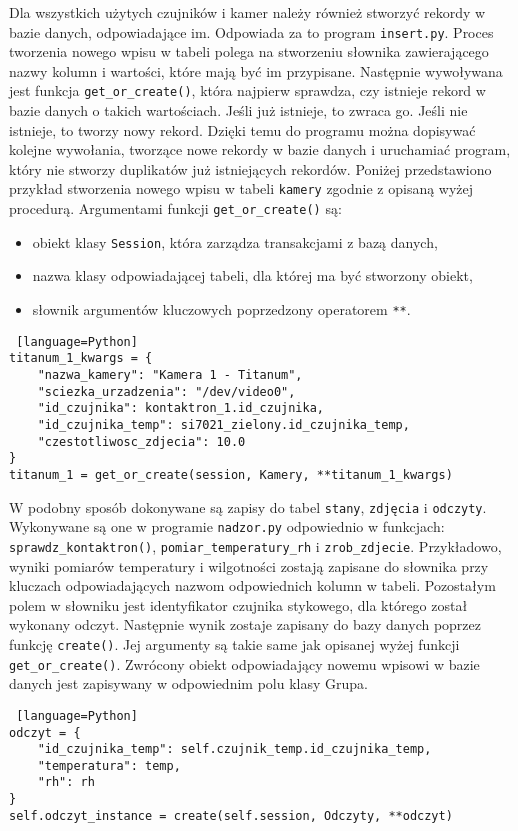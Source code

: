 \documentclass[a4paper,12pt,twoside]{article}
\begin{document}
Dla wszystkich użytych czujników i kamer należy również stworzyć rekordy w bazie danych, odpowiadające im. Odpowiada za to program \texttt{insert.py}. Proces tworzenia nowego wpisu w tabeli polega na stworzeniu słownika zawierającego nazwy kolumn i wartości, które mają być im przypisane. Następnie wywoływana jest funkcja \texttt{get{\_}or{\_}create()}, która najpierw sprawdza, czy istnieje rekord w bazie danych o takich wartościach. Jeśli już istnieje, to zwraca go. Jeśli nie istnieje, to tworzy nowy rekord. Dzięki temu do programu można dopisywać kolejne wywołania, tworzące nowe rekordy w bazie danych i uruchamiać program, który nie stworzy duplikatów już istniejących rekordów. Poniżej przedstawiono przykład stworzenia nowego wpisu w tabeli \texttt{kamery} zgodnie z opisaną wyżej procedurą. Argumentami funkcji \texttt{get{\_}or{\_}create()} są:
\begin{itemize}
\item obiekt klasy \texttt{Session}, która zarządza transakcjami z bazą danych\cite{sqlalchemy-session},
\item nazwa klasy odpowiadającej tabeli, dla której ma być stworzony obiekt,
\item słownik argumentów kluczowych poprzedzony operatorem \texttt{**}.
\end{itemize}
\begin{lstlisting} [language=Python]
titanum_1_kwargs = {
    "nazwa_kamery": "Kamera 1 - Titanum",
    "sciezka_urzadzenia": "/dev/video0",
    "id_czujnika": kontaktron_1.id_czujnika,
    "id_czujnika_temp": si7021_zielony.id_czujnika_temp,
    "czestotliwosc_zdjecia": 10.0
}
titanum_1 = get_or_create(session, Kamery, **titanum_1_kwargs)
\end{lstlisting}

W podobny sposób dokonywane są zapisy do tabel \texttt{stany}, \texttt{zdjęcia} i \texttt{odczyty}. Wykonywane są one w programie \texttt{nadzor.py} odpowiednio w funkcjach: \linebreak\texttt{sprawdz{\_}kontaktron()}, \texttt{pomiar{\_}temperatury{\_}rh} i \texttt{zrob{\_}zdjecie}. Przykładowo, wyniki pomiarów temperatury i wilgotności zostają zapisane do słownika przy kluczach odpowiadających nazwom odpowiednich kolumn w tabeli. Pozostałym polem w słowniku jest identyfikator czujnika stykowego, dla którego został wykonany odczyt. Następnie wynik zostaje zapisany do bazy danych poprzez funkcję \texttt{create()}. Jej argumenty są takie same jak opisanej wyżej funkcji \texttt{get{\_}or{\_}create()}. Zwrócony obiekt odpowiadający nowemu wpisowi w bazie danych jest zapisywany w odpowiednim polu klasy Grupa.
\begin{lstlisting} [language=Python]
odczyt = {
	"id_czujnika_temp": self.czujnik_temp.id_czujnika_temp,
	"temperatura": temp,
	"rh": rh
}
self.odczyt_instance = create(self.session, Odczyty, **odczyt)
\end{lstlisting}
\end{document}
